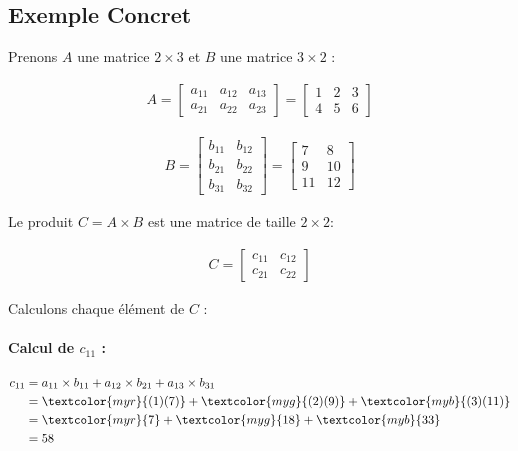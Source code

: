 \documentclass{report}
\begin{document}
\begin{multicols*}{2}
\subsection{Exemple Concret}

Prenons \( A \) une matrice \( 2 \times 3 \) et \( B \) une matrice \( 3 \times 2 \) :

\begin{align*}
    A = \begin{bmatrix}
        a_{11} & a_{12} & a_{13} \\
        a_{21} & a_{22} & a_{23}
    \end{bmatrix}
    = \begin{bmatrix}
        1 & 2 & 3 \\
        4 & 5 & 6
    \end{bmatrix}
\end{align*}

\begin{align*}
    B = \begin{bmatrix}
        b_{11} & b_{12} \\
        b_{21} & b_{22} \\
        b_{31} & b_{32}
    \end{bmatrix}
    = \begin{bmatrix}
        7 & 8 \\
        9 & 10 \\
        11 & 12
    \end{bmatrix}
\end{align*}

Le produit \( C = A \times B \) est une matrice de taille \( 2 \times 2 \):

\begin{align*}
    C = \begin{bmatrix}
        c_{11} & c_{12} \\
        c_{21} & c_{22}
    \end{bmatrix}
\end{align*}

Calculons chaque élément de \( C \) :

\paragraph{Calcul de \( c_{11} \) :}

\begin{align*}
    c_{11} &= a_{11} \times b_{11} + a_{12} \times b_{21} + a_{13} \times b_{31} \\
           &= \textcolor{myr}{(1)(7)} + \textcolor{myg}{(2)(9)} + \textcolor{myb}{(3)(11)} \\
           &= \textcolor{myr}{7} + \textcolor{myg}{18} + \textcolor{myb}{33} \\
           &= 58
\end{align*}


\end{multicols*}
\end{document}
